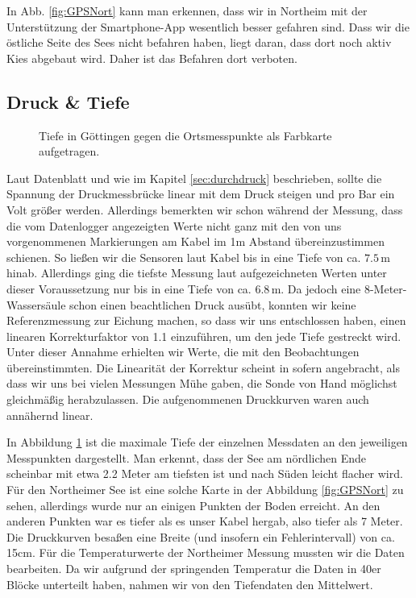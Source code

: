 \documentclass[12pt,a4paper,titlepage,headinclude,bibtotoc]{scrartcl}
\numberwithin{equation}{subsection}
\begin{document}
In Abb. \ref{fig:GPSNort} kann man erkennen, dass wir in Northeim mit der Unterstützung der Smart\-phone-App wesentlich besser gefahren sind.
Dass wir die östliche Seite des Sees nicht befahren haben, liegt daran, dass dort noch aktiv Kies abgebaut wird.
Daher ist das Befahren dort verboten.


\subsection{Druck \& Tiefe}
\label{sec:ausdruck}
\begin{figure}[!htb]
	\centering
	
	\caption{Tiefe in Göttingen gegen die Ortsmesspunkte als Farbkarte aufgetragen.}
	\label{fig:tiefeGoe}
\end{figure}
Laut Datenblatt und wie im Kapitel \ref{sec:durchdruck} beschrieben, sollte die Spannung der Druckmessbrücke linear mit dem Druck steigen und pro Bar ein Volt größer werden.
Allerdings bemerkten wir schon während der Messung, dass die vom Datenlogger angezeigten Werte nicht ganz mit den von uns vorgenommenen Markierungen am Kabel im 1m Abstand übereinzustimmen schienen.
So ließen wir die Sensoren laut Kabel bis in eine Tiefe von ca. $7.5\,$m hinab.
Allerdings ging die tiefste Messung laut aufgezeichneten Werten unter dieser Voraussetzung nur bis in eine Tiefe von ca. $6.8\,$m.
Da jedoch eine 8-Meter-Wassersäule schon einen beachtlichen Druck ausübt, konnten wir keine Referenzmessung zur Eichung machen, so dass wir uns entschlossen haben, einen linearen Korrekturfaktor von 1.1 einzuführen, um den jede Tiefe gestreckt wird.
Unter dieser Annahme erhielten wir Werte, die mit den Beobachtungen übereinstimmten.
Die Linearität der Korrektur scheint in sofern angebracht, als dass wir uns bei vielen Messungen Mühe gaben, die Sonde von Hand möglichst gleichmäßig herabzulassen.
Die aufgenommenen Druckkurven waren auch annähernd linear.

In Abbildung \ref{fig:tiefeGoe} ist die maximale Tiefe der einzelnen Messdaten an den jeweiligen Messpunkten dargestellt.
Man erkennt, dass der See am nördlichen Ende scheinbar mit etwa 2.2 Meter am tiefsten ist und nach Süden leicht flacher wird.
Für den Northeimer See ist eine solche Karte in der Abbildung \ref{fig:GPSNort} zu sehen, allerdings wurde nur an einigen Punkten der Boden erreicht.
An den anderen Punkten war es tiefer als es unser Kabel hergab, also tiefer als 7 Meter.
Die Druckkurven besaßen eine Breite (und insofern ein Fehlerintervall) von ca. 15cm.
Für die Temperaturwerte der Northeimer Messung mussten wir die Daten bearbeiten.
Da wir aufgrund der springenden Temperatur die Daten in 40er Blöcke unterteilt haben, nahmen wir von den Tiefendaten den Mittelwert.
\end{document}

